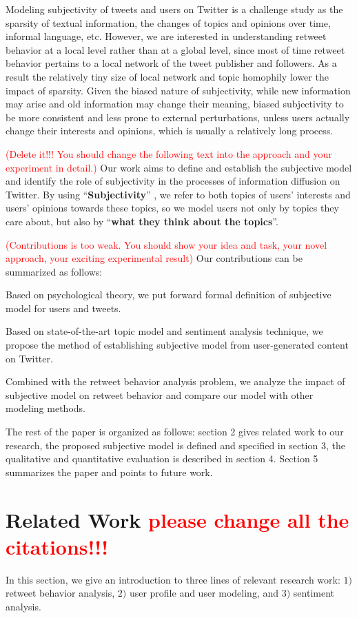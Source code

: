 \documentclass{acm_proc_article-sp}
\newcommand{\mo}[1]{\textcolor{red}{#1}}
\begin{document}
Modeling subjectivity of tweets and users on Twitter is a challenge study as the sparsity of textual information, the changes of topics and opinions over time,  informal language, etc.
However, we are interested in understanding retweet behavior at a local level rather than at a global level, since most of time retweet behavior pertains to a local network of the tweet publisher and followers. As a result the relatively tiny size of local network and topic homophily lower the impact of sparsity.
Given the biased nature of subjectivity, while new information may arise and old information may change their meaning, biased subjectivity to be more consistent and less prone to external perturbations, unless users actually change their interests and opinions, which is usually a relatively long process.

\mo{(Delete it!!! You should change the following text into the approach and your experiment in detail.)}
Our work aims to define and establish the subjective model and identify the role of subjectivity in the processes of information diffusion on Twitter.
By using ``\textbf{Subjectivity}'' , we refer to both topics of users' interests and users' opinions towards these topics, so we model users not only by topics they care about, but also by ``\textbf{what they think about the topics}''. 

\mo{(Contributions is too weak. You should show your idea and task, your novel approach, your exciting experimental result)} Our contributions can be summarized as follows:
\begin{itemize*}
\item Based on psychological theory, we put forward formal definition of subjective model for users and tweets.
\item Based on state-of-the-art topic model and sentiment analysis technique, we propose the method of establishing subjective 
model from user-generated content on Twitter.
\item Combined with the retweet behavior analysis problem, we analyze the impact of subjective model on retweet behavior and compare our model with other modeling methods.
\end{itemize*}
The rest of the paper is organized as follows: section 2 gives related work to our research, the proposed subjective model is defined and specified in section 3, the qualitative and quantitative evaluation is described in section 4. Section 5 summarizes the paper and points to future work.

\section{Related Work \mo{please change all the citations!!!}}
\label{relatedwork}
In this section, we give an introduction to three lines of relevant research work: $ 1) $ retweet behavior analysis, $ 2) $ user profile and user modeling, and $  3)$ sentiment analysis. 
\end{document}

